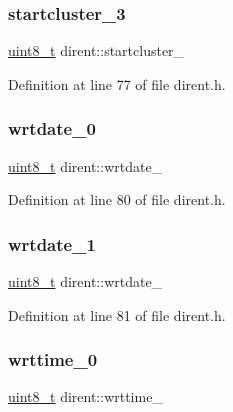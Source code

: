 \subsubsection{\texorpdfstring{startcluster\_3}{startcluster\_3}}
{\footnotesize\ttfamily \mbox{\hyperlink{stdint_8h_aba7bc1797add20fe3efdf37ced1182c5}{uint8\+\_\+t}} dirent\+::startcluster\+\_}



Definition at line 77 of file dirent.\+h.

\mbox{\label{structdirent_ae94d3b7191a50fe11fdb1b6c39c99257}} 
\subsubsection{\texorpdfstring{wrtdate\_0}{wrtdate\_0}}
{\footnotesize\ttfamily \mbox{\hyperlink{stdint_8h_aba7bc1797add20fe3efdf37ced1182c5}{uint8\+\_\+t}} dirent\+::wrtdate\+\_}



Definition at line 80 of file dirent.\+h.

\mbox{\label{structdirent_a2ae11729ca9b20123df10c4213b531a7}} 
\subsubsection{\texorpdfstring{wrtdate\_1}{wrtdate\_1}}
{\footnotesize\ttfamily \mbox{\hyperlink{stdint_8h_aba7bc1797add20fe3efdf37ced1182c5}{uint8\+\_\+t}} dirent\+::wrtdate\+\_}



Definition at line 81 of file dirent.\+h.

\mbox{\label{structdirent_ad8502c912d03639722b03cc03158ddea}} 
\subsubsection{\texorpdfstring{wrttime\_0}{wrttime\_0}}
{\footnotesize\ttfamily \mbox{\hyperlink{stdint_8h_aba7bc1797add20fe3efdf37ced1182c5}{uint8\+\_\+t}} dirent\+::wrttime\+\_}



